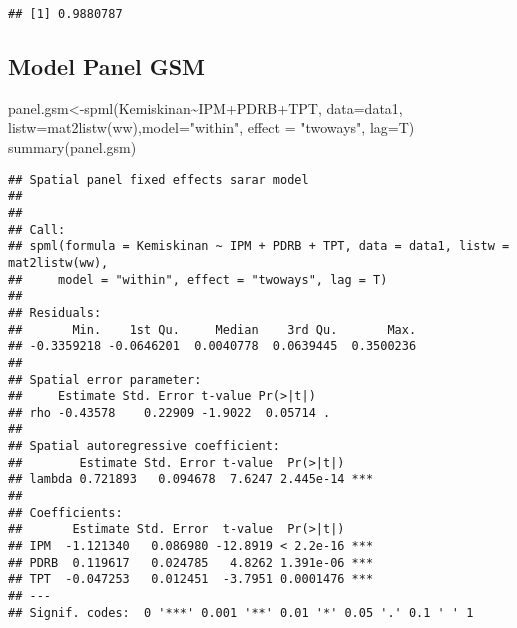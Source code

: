 \documentclass[
]{book}
\newenvironment{Shaded}{\begin{snugshade}}{\end{snugshade}}
\newcommand{\AttributeTok}[1]{\textcolor[rgb]{0.77,0.63,0.00}{#1}}
\newcommand{\DecValTok}[1]{\textcolor[rgb]{0.00,0.00,0.81}{#1}}
\newcommand{\DocumentationTok}[1]{\textcolor[rgb]{0.56,0.35,0.01}{\textbf{\textit{#1}}}}
\newcommand{\FunctionTok}[1]{\textcolor[rgb]{0.00,0.00,0.00}{#1}}
\newcommand{\NormalTok}[1]{#1}
\newcommand{\OtherTok}[1]{\textcolor[rgb]{0.56,0.35,0.01}{#1}}
\newcommand{\SpecialCharTok}[1]{\textcolor[rgb]{0.00,0.00,0.00}{#1}}
\newcommand{\StringTok}[1]{\textcolor[rgb]{0.31,0.60,0.02}{#1}}
\begin{document}
\begin{verbatim}
## [1] 0.9880787
\end{verbatim}

\hypertarget{model-panel-gsm}{%
\subsection{Model Panel GSM}\label{model-panel-gsm}}

\begin{Shaded}
\begin{Highlighting}[]
\NormalTok{panel.gsm}\OtherTok{\textless{}{-}}\FunctionTok{spml}\NormalTok{(Kemiskinan}\SpecialCharTok{\textasciitilde{}}\NormalTok{IPM}\SpecialCharTok{+}\NormalTok{PDRB}\SpecialCharTok{+}\NormalTok{TPT, }\AttributeTok{data=}\NormalTok{data1, }\AttributeTok{listw=}\FunctionTok{mat2listw}\NormalTok{(ww),}\AttributeTok{model=}\StringTok{"within"}\NormalTok{, }
                \AttributeTok{effect =} \StringTok{"twoways"}\NormalTok{, }\AttributeTok{lag=}\NormalTok{T)}
\FunctionTok{summary}\NormalTok{(panel.gsm)}
\end{Highlighting}
\end{Shaded}

\begin{verbatim}
## Spatial panel fixed effects sarar model
##  
## 
## Call:
## spml(formula = Kemiskinan ~ IPM + PDRB + TPT, data = data1, listw = mat2listw(ww), 
##     model = "within", effect = "twoways", lag = T)
## 
## Residuals:
##       Min.    1st Qu.     Median    3rd Qu.       Max. 
## -0.3359218 -0.0646201  0.0040778  0.0639445  0.3500236 
## 
## Spatial error parameter:
##     Estimate Std. Error t-value Pr(>|t|)  
## rho -0.43578    0.22909 -1.9022  0.05714 .
## 
## Spatial autoregressive coefficient:
##        Estimate Std. Error t-value  Pr(>|t|)    
## lambda 0.721893   0.094678  7.6247 2.445e-14 ***
## 
## Coefficients:
##       Estimate Std. Error  t-value  Pr(>|t|)    
## IPM  -1.121340   0.086980 -12.8919 < 2.2e-16 ***
## PDRB  0.119617   0.024785   4.8262 1.391e-06 ***
## TPT  -0.047253   0.012451  -3.7951 0.0001476 ***
## ---
## Signif. codes:  0 '***' 0.001 '**' 0.01 '*' 0.05 '.' 0.1 ' ' 1
\end{verbatim}

\begin{Shaded}
\end{Shaded}
\end{document}
